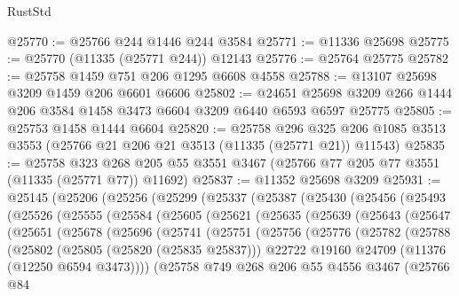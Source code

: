 \begin{lexlean}{RustStd}
\begin{coremodule}
{{{{{{{{{{{{{{{{{{{@25770 := @25766 @244 @1446 @244 @3584
@25771 := @11336 @25698
@25775 := @25770 (@11335 (@25771 @244)) @12143
@25776 := @25764 @25775
@25782 := @25758 @1459 @751 @206 @1295 @6608 @4558
@25788 := @13107 @25698 @3209 @1459 @206 @6601 @6606
@25802 := @24651 @25698 @3209 @266 @1444 @206 @3584 @1458 @3473 @6604 @3209 @6440 @6593 @6597 @25775
@25805 := @25753 @1458 @1444 @6604
@25820 := @25758
    @296
    @325
    @206
    @1085
    @3513
    @3553
    (@25766 @21 @206 @21 @3513 (@11335 (@25771 @21)) @11543)
@25835 := @25758
    @323
    @268
    @205
    @55
    @3551
    @3467
    (@25766 @77 @205 @77 @3551 (@11335 (@25771 @77)) @11692)
@25837 := @11352 @25698 @3209
@25931 := @25145
    (@25206
      (@25256
        (@25299
          (@25337
            (@25387
              (@25430
                (@25456
                  (@25493
                    (@25526
                      (@25555
                        (@25584
                          (@25605
                            (@25621
                              (@25635
                                (@25639
                                  (@25643
                                    (@25647
                                      (@25651
                                        (@25678
                                          (@25696
                                            (@25741
                                              (@25751
                                                (@25756
                                                  (@25776
                                                    (@25782
                                                      (@25788
                                                        (@25802
                                                          (@25805 (@25820 (@25835 @25837)))
                                                          @22722
                                                          @19160
                                                          @24709
                                                          (@11376 (@12250 @6594 @3473))))
                                                      (@25758
                                                        @749
                                                        @268
                                                        @206
                                                        @55
                                                        @4556
                                                        @3467
                                                        (@25766
                                                          @84
}}}}}}}}}}}}}}}}}}}
\end{coremodule}
\end{lexlean}
